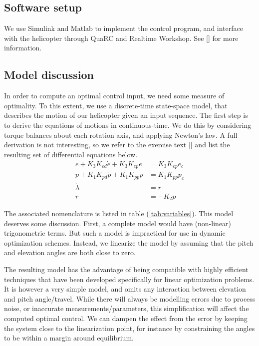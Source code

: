 \subsection{Software setup}
We use Simulink and Matlab to implement the control program, and interface with the helicopter through QuaRC and Realtime Workshop. See [\cite{LabExercise}] for more information.

\subsection{Model discussion}
In order to compute an optimal control input, we need some measure of optimality.
To this extent, we use a discrete-time state-space model, that describes the motion
of our helicopter given an input sequence. The first step is to derive the equations
of motions in continuous-time. We do this by considering torque balances about each
rotation axis, and applying Newton's law. A full derivation is not interesting, so
we refer to the exercise text [\cite{LabExercise}] and list the resulting set of
differential equations below.
\begin{subequations}
\label{eq:model_al}
\begin{align}
    \ddot{e} + K_{3} K_{ed} \dot{e} + K_{3} K_{ep} e &= K_{3} K_{ep} e_{c} \label{eq:model_se_al_elev} \\
    \ddot{p} + K_{1} K_{pd} \dot{p} + K_{1} K_{pp} p &= K_{1} K_{pp} p_{c} \label{eq:model_se_al_pitch} \\
    \dot{\lambda} &= r \label{eq:model_se_al_lambda} \\
    \dot{r} &= -K_{2} p \label{eq:model_se_al_r}
\end{align}
\end{subequations}

The associated nomenclature is listed in table (\ref{tab:variables}). This model deserves some discussion. First, a complete model would have (non-linear) trigonometric terms. But such a model is impractical for use in dynamic optimization schemes. Instead, we linearize the model by assuming that the pitch and elevation angles are both close to zero.

The resulting model has the advantage of being compatible with highly efficient techniques that have been developed specifically for linear optimization problems. It is however a very simple model, and omits any interaction between elevation and pitch angle/travel. While there will always be modelling errors due to process noise, or inaccurate measurements/parameters, this simplification will affect the computed optimal control. We can dampen the effect from the error by keeping the system close to the linearization point, for instance by constraining the angles to be within a margin around equilibrium.

